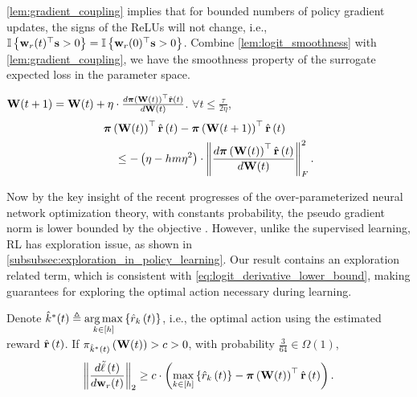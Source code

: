 \cref{lem:gradient_coupling} implies that for bounded numbers of policy gradient updates, the signs of the ReLUs will not change, i.e., ${\mathbb{I}}\left\{ {\mathbf{w}}_r(t)^\top {\mathbf{s}} > 0 \right\} = {\mathbb{I}}\left\{ {\mathbf{w}}_r(0)^\top {\mathbf{s}} > 0 \right\}$. Combine \cref{lem:logit_smoothness} with \cref{lem:gradient_coupling}, we have the smoothness property of the surrogate expected loss in the parameter space.
\begin{lem}
\label{lem:empirically_expected_reward_parameter_smoothness}
    ${\mathbf{W}}(t+1) = {\mathbf{W}}(t) + \eta \cdot \frac{d {\boldsymbol{\pi}}\left({\mathbf{W}}(t)\right)^\top \hat{{\mathbf{r}}}\left(t\right)}{d {\mathbf{W}}(t)}$. $\forall t \le \frac{\tau}{ 2 \eta }$,
\begin{equation}
\label{eq:parameter_smoothness}
\begin{split}
    &{\boldsymbol{\pi}}\left( {\mathbf{W}}(t) \right)^\top \hat{{\mathbf{r}}}\left(t\right) - {\boldsymbol{\pi}}\left( {\mathbf{W}}(t+1) \right)^\top \hat{{\mathbf{r}}}\left(t\right) \\
    &\quad \le - \left( \eta - h m \eta^2 \right) \cdot \left\| \frac{d {\boldsymbol{\pi}}\left( {\mathbf{W}}(t) \right)^\top \hat{{\mathbf{r}}}\left(t\right)}{d {\mathbf{W}}(t)} \right\|_F^2.
\end{split}
\end{equation}
\end{lem}

Now by the key insight of the recent progresses of the over-parameterized neural network optimization theory, with constants probability, the pseudo gradient norm is lower bounded by the objective \citep{li2018learning}. However, unlike the supervised learning, RL has exploration issue, as shown in \cref{subsubsec:exploration_in_policy_learning}. Our result contains an exploration related term, which is consistent with \cref{eq:logit_derivative_lower_bound}, making guarantees for exploring the optimal action necessary during learning.

\begin{lem}
\label{lem:gradient_lower_bound}
	Denote $\hat{k}^*(t) \triangleq \operatorname*{arg\,max}\limits_{k \in [h]}\left\{ \hat{r}_{k}\left(t\right) \right\}$, i.e., the optimal action using the estimated reward $ \hat{{\mathbf{r}}}\left(t\right)$. If $\pi_{\hat{k}^*(t)}\left({\mathbf{W}}(t)\right) > c > 0$, with probability $\frac{3}{64} \in \Omega\left( 1 \right)$,
\begin{equation*}
\begin{split}
	\left\| \frac{d\tilde{\ell}\left(t\right)}{d {\mathbf{w}}_r(t)} \right\|_2 \ge c \cdot \left( \max\limits_{k \in \left[h\right]}\left\{ \hat{r}_k\left(t\right) \right\} - {\boldsymbol{\pi}}\left( {\mathbf{W}}(t) \right)^\top \hat{{\mathbf{r}}}\left(t\right) \right) .
\end{split}
\end{equation*}
\end{lem}

